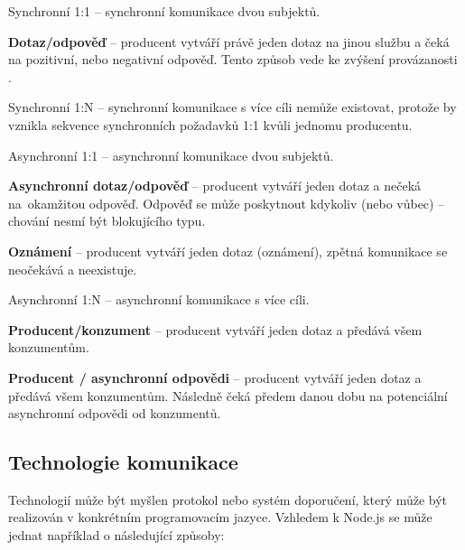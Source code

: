 \begin{dl}
   \item [Synchronní 1:1] – synchronní komunikace dvou subjektů.

   \begin{ul}
      \item \textbf{Dotaz/odpověď} – producent vytváří právě jeden dotaz na jinou službu a čeká na pozitivní, nebo negativní odpověď.
      Tento způsob vede ke zvýšení provázanosti .
   \end{ul}

   \item [Synchronní 1:N] – synchronní komunikace s více cíli nemůže existovat, protože by vznikla sekvence synchronních požadavků 1:1 kvůli jednomu producentu.

   \item [Asynchronní 1:1] – asynchronní komunikace dvou subjektů.

   \begin{ul}
      \item \textbf{Asynchronní dotaz/odpověď} – producent vytváří jeden dotaz a nečeká na~okamžitou odpověď.
      Odpověď se může poskytnout kdykoliv (nebo vůbec) – chování nesmí být blokujícího typu.
      \item \textbf{Oznámení} – producent vytváří jeden dotaz (oznámení), zpětná komunikace se neočekává a neexistuje.
   \end{ul}

   \item [Asynchronní 1:N] – asynchronní komunikace s více cíli.

   \begin{ul}
      \item \textbf{Producent/konzument} – producent vytváří jeden dotaz a předává všem konzumentům.
      \item \textbf{Producent / asynchronní odpovědi} – producent vytváří jeden dotaz a předává všem konzumentům.
      Následně čeká předem danou dobu na potenciální asynchronní odpovědi od konzumentů.
   \end{ul}
\end{dl}



\subsection{Technologie komunikace}\label{subsec:msa-communication-technology}
Technologií může být myšlen protokol nebo systém doporučení, který může být realizován v konkrétním programovacím jazyce.
Vzhledem k Node.js se může jednat například o následující způsoby:

